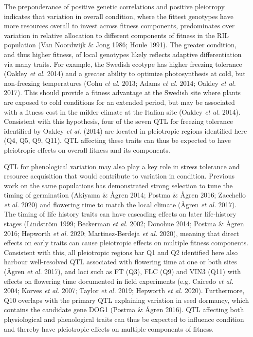 \documentclass[]{article}
\begin{document}
The preponderance of positive genetic correlations and positive pleiotropy indicates that variation in overall condition, where the fittest genotypes have more resources overall to invest across fitness components, predominates over variation in relative allocation to different components of fitness in the RIL population (Van Noordwijk \& Jong 1986; Houle 1991). The greater condition, and thus higher fitness, of local genotypes likely reflects adaptive differentiation via many traits. For example, the Swedish ecotype has higher freezing tolerance (Oakley \emph{et al.} 2014) and a greater ability to optimize photosynthesis at cold, but non-freezing temperatures (Cohu \emph{et al.} 2013; Adams \emph{et al.} 2014; Oakley \emph{et al.} 2017). This should provide a fitness advantage at the Swedish site where plants are exposed to cold conditions for an extended period, but may be associated with a fitness cost in the milder climate at the Italian site (Oakley \emph{et al.} 2014). Consistent with this hypothesis, four of the seven QTL for freezing tolerance identified by Oakley \emph{et al.} (2014) are located in pleiotropic regions identified here (Q4, Q5, Q9, Q11). QTL affecting these traits can thus be expected to have pleiotropic effects on overall fitness and its components.

QTL for phenological variation may also play a key role in stress tolerance and resource acquisition that would contribute to variation in condition. Previous work on the same populations has demonstrated strong selection to tune the timing of germination (Akiyama \& Ågren 2014; Postma \& Ågren 2016; Zacchello \emph{et al.} 2020) and flowering time to match the local climate (Ågren \emph{et al.} 2017). The timing of life history traits can have cascading effects on later life-history stages (Lindström 1999; Beckerman \emph{et al.} 2002; Donohue 2014; Postma \& Ågren 2016; Hepworth \emph{et al.} 2020; Martinez-Berdeja \emph{et al.} 2020), meaning that direct effects on early traits can cause pleiotropic effects on multiple fitness components. Consistent with this, all pleiotropic regions bar Q1 and Q2 identified here also harbour well-resolved QTL associated with flowering time at one or both sites (Ågren \emph{et al.} 2017), and loci such as FT (Q3), FLC (Q9) and VIN3 (Q11) with effects on flowering time documented in field experiments (e.g. Caicedo \emph{et al.} 2004; Korves \emph{et al.} 2007; Taylor \emph{et al.} 2019; Hepworth \emph{et al.} 2020). Furthermore, Q10 overlaps with the primary QTL explaining variation in seed dormancy, which contains the candidate gene DOG1 (Postma \& Ågren 2016). QTL affecting both physiological and phenological traits can thus be expected to influence condition and thereby have pleiotropic effects on multiple components of fitness.
\end{document}
